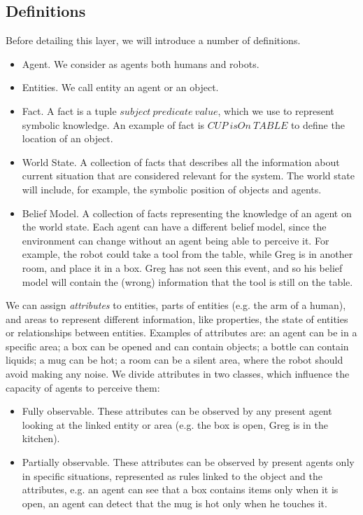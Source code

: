 \subsection{Definitions}

Before detailing this layer, we will introduce a number of definitions.
\begin{itemize}
\item Agent. We consider as agents both humans and robots.
\item Entities. We call entity an agent or an object.
\item Fact. A fact is a tuple $subject\> predicate\> value$, which we use to represent symbolic knowledge. An example of fact is $CUP\> isOn\> TABLE$ to define the location of an object. 
\item World State. A collection of facts that describes all the information about current situation that are considered relevant for the system. The world state will include, for example, the symbolic position of objects and agents.
\item Belief Model. A collection of facts representing the knowledge of an agent on the world state. Each agent can have a different belief model, since the environment can change without an agent being able to perceive it. For example, the robot could take a tool from the table, while Greg is in another room, and place it in a box. Greg has not seen this event, and so his belief model will contain the (wrong) information that the tool is still on the table.
\end{itemize}

We can assign \textit{attributes} to entities, parts of entities (e.g. the arm of a human), and areas to represent different information, like properties, the state of entities or relationships between entities. Examples of attributes are:
an agent can be in a specific area; a box can be opened and can contain objects; a bottle can contain liquids; a mug can be hot; a room can be a silent area, where the robot should avoid making any noise.
We divide attributes in two classes, which influence the capacity of agents to perceive them: 
\begin{itemize}
\item Fully observable. These attributes can be observed by any present agent looking at the linked entity or area (e.g. the box is open, Greg is in the kitchen).
\item Partially observable. These attributes can be observed by present agents only in specific situations, represented as rules linked to the object and the attributes, e.g. an agent can see that a box contains items only when it is open, an agent can detect that the mug is hot only when he touches it. 
\end{itemize}

